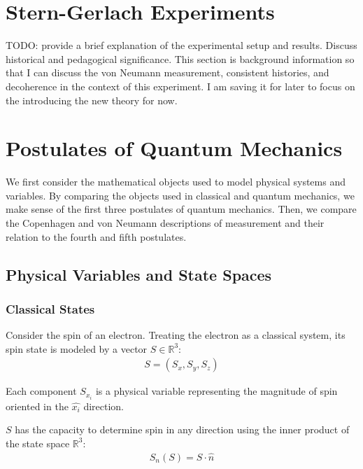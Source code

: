 \usetikzlibrary{shapes.geometric}
\usetikzlibrary{positioning}

\newcommand{\apparatus}[4]{\node[square node] (#1) at (#2,#3){#4};
                           \node[port] (#1+) at (#2 + 0.375, #3 + 0.5){+};
                           \node[port] (#1-) at (#2 + 0.375, #3 - 0.5){-};}

\chapter{Stern-Gerlach Experiments}
TODO: provide a brief explanation of the experimental setup and results. Discuss historical and pedagogical significance. This section is background information so that I can discuss the von Neumann measurement, consistent histories, and decoherence in the context of this experiment. I am saving it for later to focus on the introducing the new theory for now.

\chapter{Postulates of Quantum Mechanics}

We first consider the mathematical objects used to model physical systems and variables. By comparing the objects used in classical and quantum mechanics, we make sense of the first three postulates of quantum mechanics. Then, we compare the Copenhagen and von Neumann descriptions of measurement and their relation to the fourth and fifth postulates.

\section{Physical Variables and State Spaces}
\subsection{Classical States}
Consider the spin of an electron. Treating the electron as a classical system, its spin state is modeled by a vector $S \in \mathbb{R}^3$:
\begin{align}
S = (S_x, S_y, S_z)
\end{align}

Each component $S_{x_i}$ is a physical variable representing the magnitude of spin oriented in the $\hat{x_i}$ direction.

$S$ has the capacity to determine spin in any direction using the inner product of the state space $\mathbb{R}^3$:
\begin{align}
S_n(S) = S \cdot \hat{n}
\end{align}

